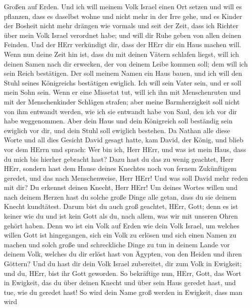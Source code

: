 Großen auf Erden.  Und ich will meinem Volk Israel einen
Ort setzen und will es pflanzen, dass es daselbst wohne und nicht mehr
in der Irre gehe, und es Kinder der Bosheit nicht mehr drängen wie
vormals und seit der Zeit, dass ich Richter über mein Volk Israel
verordnet habe;  und will dir Ruhe geben von allen deinen
Feinden. Und der HErr verkündigt dir, dass der HErr dir ein Haus machen
will.  Wenn nun deine Zeit hin ist, dass du mit deinen
Vätern schlafen liegst, will ich deinen Samen nach dir erwecken, der von
deinem Leibe kommen soll; dem will ich sein Reich bestätigen.
 Der soll meinem Namen ein Haus bauen, und ich will den
Stuhl seines Königreichs bestätigen ewiglich.  Ich will
sein Vater sein, und er soll mein Sohn sein. Wenn er eine Missetat tut,
will ich ihn mit Menschenruten und mit der Menschenkinder Schlägen
strafen;  aber meine Barmherzigkeit soll nicht von ihm
entwandt werden, wie ich sie entwandt habe von Saul, den ich vor dir
habe weggenommen.  Aber dein Haus und dein Königreich soll
beständig sein ewiglich vor dir, und dein Stuhl soll ewiglich bestehen.
 Da Nathan alle diese Worte und all dies Gesicht David
gesagt hatte,  kam David, der König, und blieb vor dem
HErrn und sprach: Wer bin ich, Herr HErr, und was ist mein Haus, dass du
mich bis hierher gebracht hast?  Dazu hast du das zu wenig
geachtet, Herr HErr, sondern hast dem Hause deines Knechtes noch von
fernem Zukünftigem geredet, und das nach Menschenweise, Herr HErr!
 Und was soll David mehr reden mit dir? Du erkennst deinen
Knecht, Herr HErr!  Um deines Wortes willen und nach deinem
Herzen hast du solche große Dinge alle getan, dass du sie deinem Knecht
kundtätest.  Darum bist du auch groß geachtet, HErr, Gott;
denn es ist keiner wie du und ist kein Gott als du, nach allem, was wir
mit unseren Ohren gehört haben.  Denn wo ist ein Volk auf
Erden wie dein Volk Israel, um welches willen Gott ist hingegangen, sich
ein Volk zu erlösen und sich einen Namen zu machen und solch große und
schreckliche Dinge zu tun in deinem Lande vor deinem Volk, welches du
dir erlöst hast von Ägypten, von den Heiden und ihren Göttern?
 Und du hast dir dein Volk Israel zubereitet, dir zum Volk
in Ewigkeit; und du, HErr, bist ihr Gott geworden.  So
bekräftige nun, HErr, Gott, das Wort in Ewigkeit, das du über deinen
Knecht und über sein Haus geredet hast, und tue, wie du geredet hast!
 So wird dein Name groß werden in Ewigkeit, dass man wird
